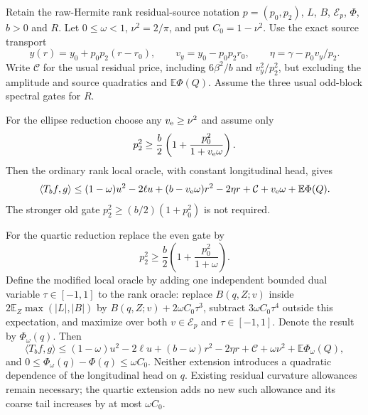 \begin{proposition}
\label{prop:jensen-rank-reductions}
Retain the raw-Hermite rank residual-source notation
$p=(p_0,p_2)$, $L$, $B$, $\mathcal E_p$, $\Phi$, $b>0$ and $R$.
Let $0\le\omega<1$, $\nu^2=2/\pi$, and put $C_0=1-\nu^2$.
Use the exact source transport
\[
 y(r)=y_0+p_0p_2(r-r_0),\qquad v_y=y_0-p_0p_2r_0,
 \qquad \eta=\gamma-p_0v_y/p_2.
\]
Write $\mathcal C$ for the usual residual price, including
$6\beta^2/b$ and $v_y^2/p_2^2$, but excluding the amplitude and
source quadratics and $\mathbb E\Phi(Q)$.
Assume the three usual odd-block spectral gates for $R$.

For the ellipse reduction choose any $v_{\rm e}\ge\nu^2$ and assume only
\begin{equation}\label{eq:jensen-ellipse-even-gate}
 p_2^2\ge\frac b2\left(1+\frac{p_0^2}{1+v_{\rm e}\omega}\right).
\end{equation}
Then the ordinary rank local oracle, with constant longitudinal head,
gives
\begin{equation}\label{eq:jensen-ellipse-rank-price}
 \langle T_bf,g\rangle\le
 (1-\omega)u^2-2\ell u+(b-v_{\rm e}\omega)r^2-2\eta r
 +\mathcal C+v_{\rm e}\omega+\mathbb E\Phi(Q).
\end{equation}
The stronger old gate $p_2^2\ge(b/2)(1+p_0^2)$ is not required.

For the quartic reduction replace the even gate by
\begin{equation}\label{eq:jensen-quartic-even-gate}
 p_2^2\ge\frac b2\left(1+\frac{p_0^2}{1+\omega}\right).
\end{equation}
Define the modified local oracle by adding one independent bounded
dual variable $\tau\in[-1,1]$ to the rank oracle: replace $B(q,Z;v)$
inside $2\mathbb E_Z\max(|L|,|B|)$ by
$B(q,Z;v)+2\omega C_0\tau^3$, subtract $3\omega C_0\tau^4$
outside this expectation, and maximize over both $v\in\mathcal E_p$
and $\tau\in[-1,1]$. Denote the result by $\Phi_\omega(q)$.
Then
\begin{equation}\label{eq:jensen-quartic-rank-price}
 \langle T_bf,g\rangle\le
 (1-\omega)u^2-2\ell u+(b-\omega)r^2-2\eta r
 +\mathcal C+\omega\nu^2+\mathbb E\Phi_\omega(Q),
\end{equation}
and $0\le\Phi_\omega(q)-\Phi(q)\le\omega C_0$.
Neither extension introduces a quadratic dependence of the longitudinal
head on $q$. Existing residual curvature allowances remain necessary;
the quartic extension adds no new such allowance and its coarse tail
increases by at most $\omega C_0$.
\end{proposition}
